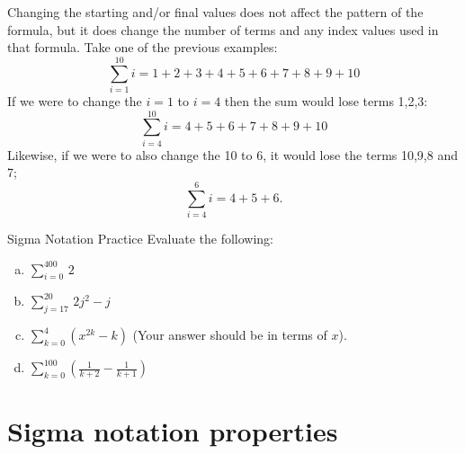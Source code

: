 Changing the starting and/or final values does not affect the pattern of the formula, but it does change the number of terms and any index values used in that formula.  Take one of the previous examples:
\[\sum _{i=1}^{10}i = 1 + 2 + 3 + 4 + 5 + 6 + 7 + 8 + 9 + 10\]
If we were to change the $i=1$ to $i=4$ then the sum would lose terms 1,2,3:
\[\sum _{i=4}^{10}i = 4 + 5 + 6 + 7 + 8 + 9 + 10\]
Likewise, if we were to also change the 10 to 6, it would lose the terms 10,9,8 and 7;
\[\sum _{i=4}^{6}i = 4 + 5 + 6.\]

\begin{exercise}{Sigma Notation Practice}
Evaluate the following:
\begin{enumerate}[(a)]
\item
$\displaystyle{\sum _{i=0}^{400} \,2}$
\item
$\displaystyle{ \sum_{j=17}^{20} \, 2j^2 - j}$
\item
$\displaystyle{ \sum_{k=0}^{4}(x^{2k} - k)}$  \quad (Your answer should be in terms of  $x$).
\item
$\displaystyle{ \sum_{k=0}^{100} \left(\frac{1}{k+2} - \frac{1}{k+1}\right)}$
\end {enumerate}
\end{exercise}

\section{Sigma notation properties} \label{sec:sigmaProperties}

